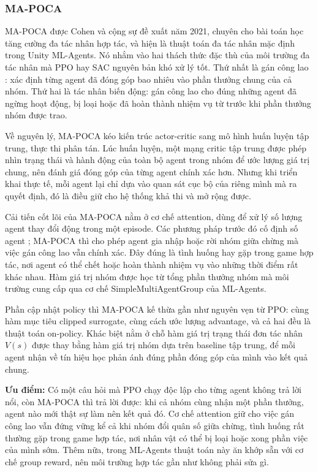 \subsubsection{MA-POCA}
\indent MA-POCA được Cohen và cộng sự \cite{cohen2022mapoca} đề xuất năm 2021, chuyên cho
bài toán học tăng cường đa tác nhân hợp tác, và hiện là thuật
toán đa tác nhân mặc định trong Unity ML-Agents. Nó nhắm vào hai thách thức đặc thù của
môi trường đa tác nhân mà PPO hay SAC nguyên bản khó xử lý tốt. Thứ nhất là gán công lao
: xác định từng agent đã đóng góp bao nhiêu vào phần thưởng chung của
cả nhóm. Thứ hai là tác nhân biến động: gán công lao cho đúng những
agent đã ngừng hoạt động, bị loại hoặc đã hoàn thành nhiệm vụ từ trước khi phần thưởng
nhóm được trao.

\indent Về nguyên lý, MA-POCA kéo kiến trúc actor-critic sang mô hình huấn luyện tập
trung, thực thi phân tán. Lúc huấn
luyện, một mạng critic tập trung được phép nhìn trạng thái và hành
động của toàn bộ agent trong nhóm để ước lượng giá trị chung, nên đánh giá đóng góp của
từng agent chính xác hơn. Nhưng khi triển khai thực tế, mỗi agent lại chỉ dựa vào quan sát
cục bộ của riêng mình mà ra quyết định, đó là điều giữ cho hệ thống khả thi và mở rộng
được.

\indent Cải tiến cốt lõi của MA-POCA nằm ở cơ chế attention, dùng để xử lý số lượng agent
thay đổi động trong một episode. Các phương pháp trước đó cố định số agent
\cite{lowe2017multiagent, foerster2018counterfactual}; MA-POCA thì cho phép agent gia nhập
hoặc rời nhóm giữa chừng mà việc gán công lao vẫn chính xác. Đây đúng là tình huống hay
gặp trong game hợp tác, nơi agent có thể chết hoặc hoàn thành nhiệm vụ vào những thời
điểm rất khác nhau. Hàm giá trị nhóm được học từ tổng phần thưởng nhóm mà
môi trường cung cấp qua cơ chế SimpleMultiAgentGroup của ML-Agents.

\indent Phần cập nhật policy thì MA-POCA kế thừa gần như nguyên vẹn từ PPO: cùng hàm mục
tiêu clipped surrogate, cùng cách ước lượng advantage, và cả hai đều là thuật toán
on-policy. Khác biệt nằm ở chỗ hàm giá trị trạng thái đơn tác nhân $V(s)$ được thay bằng
hàm giá trị nhóm dựa trên baseline tập trung, để mỗi agent nhận về tín hiệu học phản ánh
đúng phần đóng góp của mình vào kết quả chung.

\indent \textbf{Ưu điểm:} Có một câu hỏi mà PPO chạy độc lập cho từng agent không trả lời
nổi, còn MA-POCA thì trả lời được: khi cả nhóm cùng nhận một phần thưởng, agent nào mới
thật sự làm nên kết quả đó. Cơ chế attention giữ cho việc gán công lao vẫn đứng vững kể cả
khi nhóm đổi quân số giữa chừng, tình huống rất thường gặp trong game hợp tác, nơi nhân
vật có thể bị loại hoặc xong phần việc của mình sớm. Thêm nữa, trong ML-Agents thuật toán
này ăn khớp sẵn với cơ chế group reward, nên môi trường hợp tác gần như không phải sửa gì.


